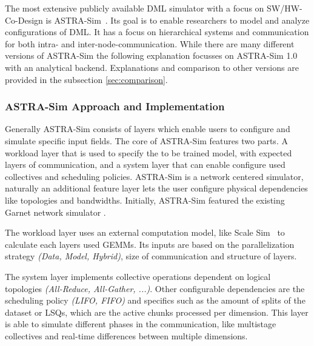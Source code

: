 

The most extensive publicly available \ac{DML} simulator with a focus on \ac{SW}/\ac{HW}-Co-Design is \ac{ASTRA-Sim}~\cite{rashidi_astra-sim_2020}.  
Its goal is to enable researchers to model and analyze configurations of \ac{DML}. It has a focus on hierarchical systems and communication for both intra- and inter-node-communication.
While there are many different versions of \ac{ASTRA-Sim} the following explanation focusses on \ac{ASTRA-Sim} 1.0 with an analytical backend. Explanations and comparison to other versions are provided in the subsection \ref{sec:comparison}.

\subsubsection*{ASTRA-Sim Approach and Implementation}
Generally \ac{ASTRA-Sim} consists of layers which enable users to configure and simulate specific input fields. The core of ASTRA-Sim features two parts. A workload layer that is used to specify the to be trained model, with expected layers of communication, and a system layer that can enable configure used collectives and scheduling policies.
\ac{ASTRA-Sim} is a network centered simulator, naturally an additional feature layer lets the user configure physical dependencies like topologies and bandwidths.
Initially, \ac{ASTRA-Sim} featured the existing Garnet network simulator \cite{agarwal_garnet_2009}. %

The workload layer uses an external computation model, like Scale Sim~\cite{samajdar_scale-sim_2019} to calculate each layers used \acp{GEMM}. Its inputs are based on the parallelization strategy \textit{(Data, Model, Hybrid)}, size of communication and structure of layers. 

The system layer implements collective operations dependent on logical topologies \textit{(All-Reduce, All-Gather, ...)}. Other configurable dependencies are the scheduling policy \textit{(\ac{LIFO}, \ac{FIFO})} and specifics such as the amount of splits of the dataset or \acp{LSQ}, which are the active chunks processed per dimension. This layer is able to simulate different phases in the communication, like multistage collectives and real-time differences between multiple dimensions.

